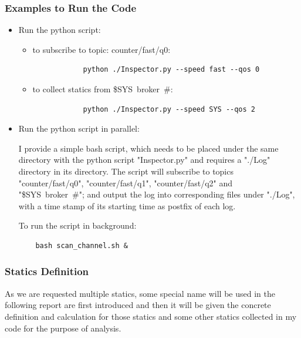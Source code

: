 \documentclass[12pt, letterpaper]{article}
\begin{document}
\subsubsection{Examples to Run the Code}

\begin{itemize}
\item Run the python script:

	\begin{itemize}
		\item to subscribe to topic: counter/fast/q0:
			\begin{verbatim}
			python ./Inspector.py --speed fast --qos 0	
			\end{verbatim}
				
		\item to collect statics from \$SYS\ broker\ \#:
			\begin{verbatim}
			python ./Inspector.py --speed SYS --qos 2
			\end{verbatim}
	\end{itemize}

\item Run the python script in parallel:
	
	I provide a simple bash script, which needs to be placed under the same directory with the python script "Inspector.py" and requires a "./Log" directory in its directory. The script will subscribe to topics "counter/fast/q0", "counter/fast/q1", "counter/fast/q2" and "\$SYS\ broker\ \#"; and output the log into corresponding files under "./Log", with a time stamp of its starting time as postfix of each log.
	
	To run the script in background:
	\begin{verbatim}
	bash scan_channel.sh &
	\end{verbatim}
	
\end{itemize}



\subsubsection{Statics Definition}

As we are requested multiple statics, some special name will be used in the following report are first introduced and then it will be given the concrete definition and calculation for those statics and some other statics collected in my code for the purpose of analysis.
\end{document}
